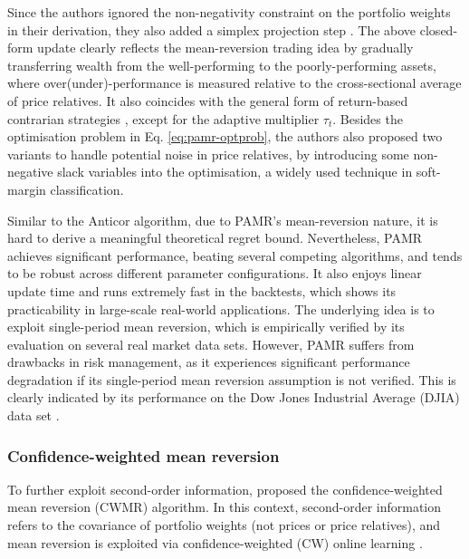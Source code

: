Since the authors ignored the non-negativity constraint on the portfolio weights in their derivation, they also added a simplex projection step \citep{duchi08}. The above closed-form update clearly reflects the mean-reversion trading idea by gradually transferring wealth from the well-performing to the poorly-performing assets, where over(under)-performance is measured relative to the cross-sectional average of price relatives. It also coincides with the general form of return-based contrarian strategies \citep[Eq.~(1)]{lo90}, except for the adaptive multiplier $\tau_t$. Besides the optimisation problem in Eq. \eqref{eq:pamr-optprob}, the authors also proposed two variants to handle potential noise in price relatives, by introducing some non-negative slack variables into the optimisation, a widely used technique in soft-margin classification.

Similar to the Anticor algorithm, due to PAMR's mean-reversion nature, it is hard to derive a meaningful theoretical regret bound. Nevertheless, PAMR achieves significant performance, beating several competing algorithms, and tends to be robust across different parameter configurations. It also enjoys linear update time and runs extremely fast in the backtests, which shows its practicability in large-scale real-world applications. The underlying idea is to exploit single-period mean reversion, which is empirically verified by its evaluation on several real market data sets. However, PAMR suffers from drawbacks in risk management, as it experiences significant performance degradation if its single-period mean reversion assumption is not verified. This is clearly indicated by its performance on the Dow Jones Industrial Average (DJIA) data set \citep{borodin04, pamr}.


\subsubsection{Confidence-weighted mean reversion}

To further exploit second-order information, \citet{cwmr} proposed the confidence-weighted mean reversion (CWMR) algorithm. In this context, second-order information refers to the covariance of portfolio weights (not prices or price relatives), and mean reversion is exploited via confidence-weighted (CW) online learning \citep{dredze08}.

